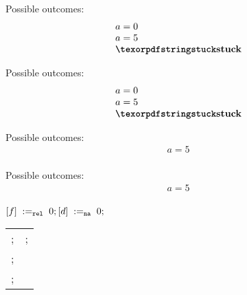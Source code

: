 \begin{minipage}[t]{0.3\linewidth}
Possible outcomes:\\
\[\begin{array}{l}
a = 0 \\
a = 5 \\
\kw{stuck} \\
\end{array}\]
\end{minipage}
%
\mpTemplate{\rlx}{\na}{\na}{\rel}{\rlx}{\na}
\litmusTestEnd

\begin{minipage}[t]{0.3\linewidth}
Possible outcomes:\\
\[\begin{array}{l}
a = 0 \\
a = 5 \\
\kw{stuck} \\
\end{array}\]
\end{minipage}
%
\mpTemplate{\rlx}{\na}{\na}{\rlx}{\acq}{\na}
\litmusTestEnd

\begin{minipage}[t]{0.3\linewidth}
Possible outcomes:\\
\[\begin{array}{l}
a = 5 \\
\end{array}\]
\end{minipage}
%
\mpTemplate{\rlx}{\na}{\na}{\rel}{\acq}{\na}
\litmusTestEnd

\begin{minipage}[t]{0.3\linewidth}
Possible outcomes:\\
\[\begin{array}{l}
a = 5 \\
\end{array}\]
\end{minipage}
%
\codePrefix
  $[f] \;:=_{{\mathtt{rel}}}\;0; [d] \;:=_{\mathtt{na}}\;0;$ \\
  \begin{tabular}{L || L}
    ; & ; \\
    ; & \\
    ; & \\
  \end{tabular}
\codePostfix
\litmusTestEnd

